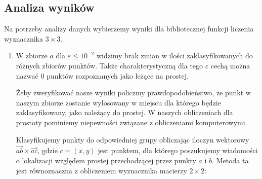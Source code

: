              \subsection{Analiza wyników}
\quad Na potrzeby analizy danych wybierzemy wyniki dla bibliotecznej 
funkcji liczenia wyznacznika $3 \times 3$.
\begin{enumerate}
    \item \quad W zbiorze $a$ dla $\varepsilon \leq 10^{-2}$ widzimy brak zmian 
w ilości zaklasyfikowanych do różnych zbiorów punktów. Także charakterystyczną dla tego $\varepsilon$ 
cechą można nazwać $0$ punktów rozpoznanych jako leżące na prostej.\par
\quad Żeby zweryfikować nasze wyniki policzmy prawdopodobieństwo, że punkt w naszym zbiorze zostanie 
wylosowany w miejscu dla którego będzie zaklasyfikowany, jako należący do prostej. 
W naszych obliczeniach dla prostoty pominiemy niepewności związane z obliczeniami komputerowymi.\par
\quad Klasyfikujemy punkty do odpowiedniej grupy obliczając iloczyn wektorowy
$\overrightarrow{ab} \times \overrightarrow{ac}$, gdzie $ c = (x,y)$ jest punktem, dla którego poszukujemy wiadomości o lokalizacji względem prostej przechodzącej przez punkty $ a$ i $ b$. Metoda ta jest równoznaczna z obliczeniem wyznacznika macierzy $ 2\times2$:  


\end{enumerate}
